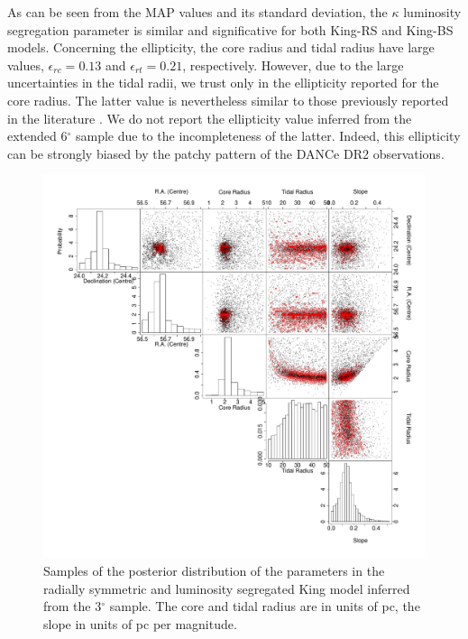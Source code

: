 As can be seen from the MAP values and its standard deviation, the $\kappa$ luminosity segregation parameter is similar and significative for both King-RS and King-BS models. Concerning the ellipticity, the core radius and tidal radius have large values, $\epsilon_{rc}= 0.13$ and $\epsilon_{rt}= 0.21$, respectively. However, due to the large uncertainties in the tidal radii, we trust only in the ellipticity reported for the core radius. The latter value is nevertheless similar to those previously reported in the literature \cite[0.17 and 0.1 to 0.35 reported by][respectively]{Raboud1998,Adams2001}. We do not report the ellipticity value inferred from the extended 6$^\circ$ sample due to the incompleteness of the latter. Indeed, this ellipticity can be strongly biased by the patchy pattern of the DANCe DR2 observations.

\begin{figure}[H]
 \centering
  \includegraphics[width=\textwidth]{background/Figures/PSD/KingRS7.pdf}
  \caption{Samples of the posterior distribution of the parameters in the radially symmetric and luminosity segregated King model inferred from the 3$^{\circ}$ sample. The core and tidal radius are in units of pc, the slope in units of pc per magnitude.}
\label{fig:KingRS7}
\end {figure}

